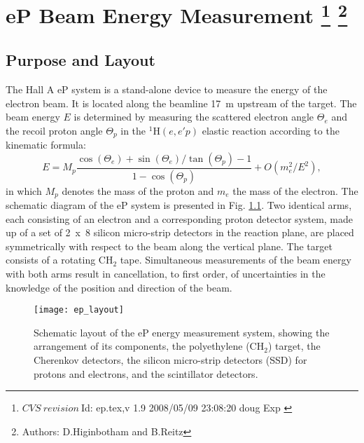 \chapter[eP Beam Energy Measurement]{eP Beam Energy Measurement
\label{sec:ep}
\footnote{
  $CVS~revision~ $Id: ep.tex,v 1.9 2008/05/09 23:08:20 doug Exp $ $
}
\footnote{Authors: D.Higinbotham  and B.Reitz }
}
\section {Purpose and Layout}
\label{sec:ep_purpose}

The Hall A eP system is a stand-alone device to measure the 
energy of the electron beam. It is located along the beamline
17~m upstream of the target. The beam energy $E$ is determined by measuring
the scattered electron angle $\Theta_e$ and the recoil proton angle
$\Theta_p$ in the $^1$H$(e,e'p)$ elastic reaction according to the kinematic
formula:
\begin{equation}
E = M_p \frac{\cos(\Theta_e) + \sin(\Theta_e)/\tan(\Theta_p) - 1}{1 - \cos(\Theta_p)} + O(m_e^2/E^2),
\end{equation}
in which $M_p$ denotes the mass of the proton and $m_e$ the mass of the electron.
The schematic diagram of the eP system is presented in Fig. \ref{fig:ep_layout}. 
Two identical arms, each consisting of an electron and a corresponding proton 
detector system, made up of a set of 2~x~8 silicon micro-strip detectors in the
reaction plane, are placed symmetrically with respect to the beam along the 
vertical plane. The target consists of a rotating CH$_2$ tape.
Simultaneous measurements of the beam energy with both arms result
in cancellation, to first order, of uncertainties in the knowledge of the position
and direction of the beam. 
 \begin{figure}[htb]
    \begin{center}
        \texttt{[image: ep\_layout]}
    \end{center}
    \caption[eP: Layout]{
            Schematic layout of the eP energy measurement system,
            showing the arrangement of its components, the polyethylene (CH$_2$) 
            target, the Cherenkov detectors, the silicon micro-strip detectors (SSD) 
            for protons and electrons, and the scintillator detectors.
            }
    \label{fig:ep_layout} 
 \end{figure}  

